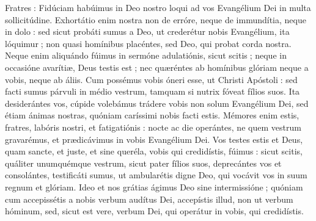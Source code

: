 \begin{paracol}{2}
Fratres : Fidúciam habúimus in Deo  nostro loqui ad vos Evangélium Dei in multa sollicitúdine. Exhortátio enim nostra non de erróre, neque de immundítia, neque in dolo : sed sicut probáti sumus a Deo, ut crederétur nobis Evangélium, ita lóquimur ; non quasi homínibus placéntes, sed Deo, qui probat corda nostra. Neque enim aliquándo fúimus in sermóne adulatiónis, sicut scitis ; neque in occasióne avarítiæ, Deus testis est ; nec quæréntes ab homínibus glóriam neque a vobis, neque ab áliis. Cum possémus vobis óneri esse, ut Christi Apóstoli : sed facti sumus párvuli in médio vestrum, tamquam si nutrix fóveat fílios suos. Ita desiderántes vos, cúpide volebámus trádere vobis non solum Evangélium Dei, sed étiam ánimas nostras, quóniam caríssimi nobis facti estis. Mémores enim estis, fratres, labóris nostri, et fatigatiónis : nocte ac die operántes, ne quem vestrum gravarémus, et prædicávimus in vobis Evangélium Dei. Vos testes estis et Deus, quam sancte, et juste, et sine queréla, vobis qui credidístis, fúimus : sicut scitis, quáliter unumquémque vestrum, sicut pater fílios suos, deprecántes vos et consolántes, testificáti sumus, ut ambularétis digne Deo, qui vocávit vos in suum regnum et glóriam. Ideo et nos grátias ágimus Deo sine intermissióne ; quóniam cum accepissétis a nobis verbum audítus Dei, accepístis illud, non ut verbum hóminum, sed, sicut est vere, verbum Dei, qui operátur in vobis, qui credidístis.
\switchcolumn

\end{paracol}
